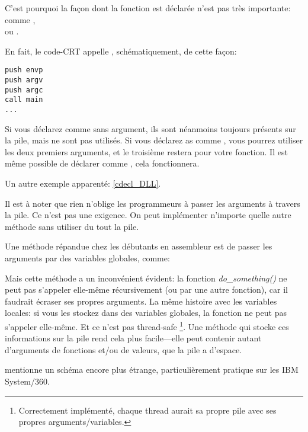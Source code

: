 \label{main_arguments}
\par
C'est pourquoi la façon dont la fonction \main est déclarée n'est pas très importante:
comme \main, \\ ou .

En fait, le code-\ac{CRT} appelle \main, schématiquement, de cette façon:
	
\begin{lstlisting}[style=customasmx86]
push envp
push argv
push argc
call main
...
\end{lstlisting}

Si vous déclarez \main comme \main sans argument, ils sont néanmoins toujours présents
sur la pile, mais ne sont pas utilisés.
Si vous déclarez \main as comme ,
vous pourrez utiliser les deux premiers arguments, et le troisième restera 
pour votre fonction.
Il est même possible de déclarer \main comme , cela fonctionnera.

Un autre exemple apparenté: \ref{cdecl_DLL}.


Il est à noter que rien n'oblige les programmeurs à passer les arguments à travers
la pile. Ce n'est pas une exigence.
On peut implémenter n'importe quelle autre méthode sans utiliser du tout la pile.

Une méthode répandue chez les débutants en assembleur est de passer les arguments
par des variables globales, comme:



Mais cette méthode a un inconvénient évident: la fonction \emph{do\_something()}
ne peut pas s'appeler elle-même récursivement (ou par une autre fonction),
car il faudrait écraser ses propres arguments.
La même histoire avec les variables locales: si vous les stockez dans des variables
globales, la fonction ne peut pas s'appeler elle-même.
Et ce n'est pas thread-safe
\footnote{Correctement implémenté, chaque thread aurait sa propre pile avec ses propres arguments/variables.}.
Une méthode qui stocke ces informations sur la pile rend cela plus facile---elle
peut contenir autant d'arguments de fonctions et/ou de valeurs, que la pile a d'espace.

 mentionne un schéma encore plus étrange, particulièrement
pratique sur les IBM System/360.

